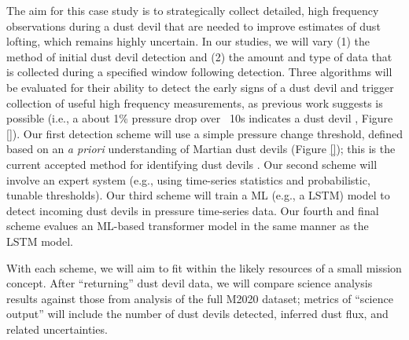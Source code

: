 The aim for this case study is to strategically collect detailed, high frequency observations during a dust devil that are needed to improve estimates of dust lofting, which remains highly uncertain.
In our studies, we will vary (1) the method of initial dust devil detection and (2) the amount and type of data that is collected during a specified window following detection.
Three algorithms will be evaluated for their ability to detect the early signs of a dust devil and trigger collection of useful high frequency measurements, as previous work suggests is possible (i.e., a about 1\% pressure drop over ~10s indicates a dust devil \cite{8inabstract}, Figure \ref{}). 
Our first detection scheme will use a simple pressure change threshold, defined based on an \textit{a priori} understanding of Martian dust devils (Figure \ref{}); this is the current accepted method for identifying dust devils \cite{8inabstract}. 
Our second scheme will involve an expert system (e.g., using time-series statistics and probabilistic, tunable thresholds). 
Our third scheme will train a \acrlong{ML} (e.g., a \acrfull{LSTM}) model to detect incoming dust devils in pressure time-series data.
Our fourth and final scheme evalues an \acrshort{ML}-based transformer model in the same manner as the \acrshort{LSTM} model.

With each scheme, we will aim to fit within the likely resources of a small mission concept. After “returning” dust devil data, we will compare science analysis results against those from analysis of the full M2020 dataset; metrics of “science output” will include the number of dust devils detected, inferred dust flux, and related uncertainties.
